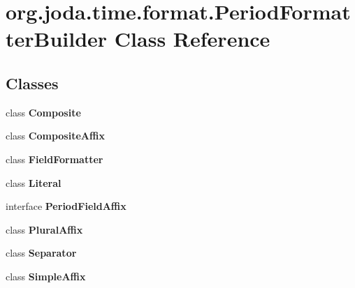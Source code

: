 \hypertarget{classorg_1_1joda_1_1time_1_1format_1_1_period_formatter_builder}{\section{org.\-joda.\-time.\-format.\-Period\-Formatter\-Builder Class Reference}
\label{classorg_1_1joda_1_1time_1_1format_1_1_period_formatter_builder}
}
\subsection*{Classes}
\begin{DoxyCompactItemize}
\item 
class {\bfseries Composite}
\item 
class {\bfseries Composite\-Affix}
\item 
class {\bfseries Field\-Formatter}
\item 
class {\bfseries Literal}
\item 
interface {\bfseries Period\-Field\-Affix}
\item 
class {\bfseries Plural\-Affix}
\item 
class {\bfseries Separator}
\item 
class {\bfseries Simple\-Affix}
\end{DoxyCompactItemize}
